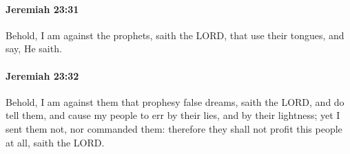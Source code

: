 		\paragraph{Jeremiah 23:31} %
			\label{JEREMIAH-23-31}

			Behold, I am against the prophets, saith the LORD, that use their tongues, and say, He saith.


		\paragraph{Jeremiah 23:32} %
			\label{JEREMIAH-23-32}

			Behold, I am against them that prophesy false dreams, saith the LORD, and do tell them, and cause my people to err by their lies, and by their lightness; yet I sent them not, nor commanded them: therefore they shall not profit this people at all, saith the LORD.


